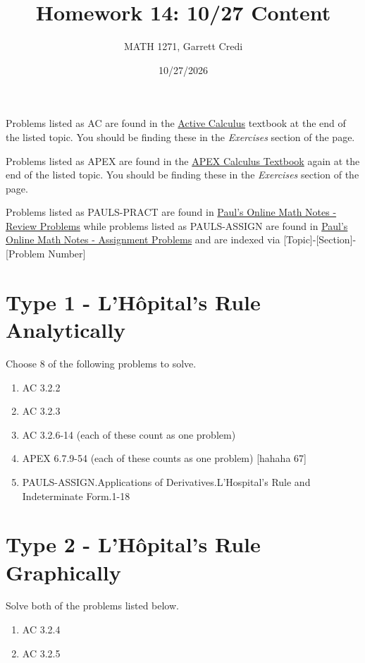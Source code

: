 \documentclass[12pt]{article}
\title{Homework 14: 10/27 Content}
\author{MATH 1271, Garrett Credi}
\date{10/27/2026}
\begin{document}
\maketitle

Problems listed as AC are found in the \href{https://activecalculus.org/single2e/frontmatter.html}{Active Calculus} 
textbook at the end of the listed topic. You should be finding these in the \textit{Exercises} section of the page.

Problems listed as APEX are found in the \href{https://opentext.uleth.ca/apex-calculus/apex-calculus.html}{APEX Calculus Textbook}
again at the end of the listed topic. You should be finding these in the \textit{Exercises} section of the page.

Problems listed as PAULS-PRACT are found in \href{https://tutorial.math.lamar.edu/Problems/CalcI/CalcI.aspx}{Paul's Online Math Notes - Review Problems}
while problems listed as PAULS-ASSIGN are found in \href{https://tutorial.math.lamar.edu/ProblemsNS/CalcI/CalcI.aspx}{Paul's Online Math Notes - Assignment Problems}
and are indexed via [Topic]-[Section]-[Problem Number]

\section{Type 1 - L'Hôpital's Rule Analytically}

Choose 8 of the following problems to solve.

\begin{enumerate}
  \item AC 3.2.2
  \item AC 3.2.3
  \item AC 3.2.6-14 (each of these count as one problem)
  \item APEX 6.7.9-54 (each of these counts as one problem) [hahaha 67]
  \item PAULS-ASSIGN.Applications of Derivatives.L'Hospital's Rule and Indeterminate Form.1-18
\end{enumerate}

\section{Type 2 - L'Hôpital's Rule Graphically}

Solve both of the problems listed below.

\begin{enumerate}
  \item AC 3.2.4
  \item AC 3.2.5
\end{enumerate}
\end{document}
